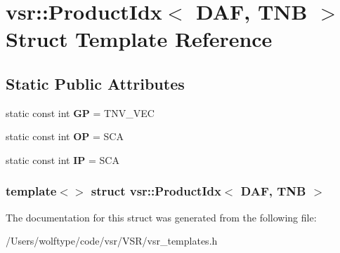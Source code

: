 \hypertarget{structvsr_1_1_product_idx_3_01_d_a_f_00_01_t_n_b_01_4}{\section{vsr\-:\-:Product\-Idx$<$ D\-A\-F, T\-N\-B $>$ Struct Template Reference}
\label{structvsr_1_1_product_idx_3_01_d_a_f_00_01_t_n_b_01_4}
}
\subsection*{Static Public Attributes}
\begin{DoxyCompactItemize}
\item 
\hypertarget{structvsr_1_1_product_idx_3_01_d_a_f_00_01_t_n_b_01_4_a4ee888fdd16e9022fbf97ea9fa7d15f1}{static const int {\bfseries G\-P} = T\-N\-V\-\_\-\-V\-E\-C}\label{structvsr_1_1_product_idx_3_01_d_a_f_00_01_t_n_b_01_4_a4ee888fdd16e9022fbf97ea9fa7d15f1}

\item 
\hypertarget{structvsr_1_1_product_idx_3_01_d_a_f_00_01_t_n_b_01_4_aa8405d655af44e7439a7e11daec2aed8}{static const int {\bfseries O\-P} = S\-C\-A}\label{structvsr_1_1_product_idx_3_01_d_a_f_00_01_t_n_b_01_4_aa8405d655af44e7439a7e11daec2aed8}

\item 
\hypertarget{structvsr_1_1_product_idx_3_01_d_a_f_00_01_t_n_b_01_4_aa9d0ef12f15328bf32088b2a6049e39f}{static const int {\bfseries I\-P} = S\-C\-A}\label{structvsr_1_1_product_idx_3_01_d_a_f_00_01_t_n_b_01_4_aa9d0ef12f15328bf32088b2a6049e39f}

\end{DoxyCompactItemize}
\subsubsection*{template$<$$>$ struct vsr\-::\-Product\-Idx$<$ D\-A\-F, T\-N\-B $>$}



The documentation for this struct was generated from the following file\-:\begin{DoxyCompactItemize}
\item 
/\-Users/wolftype/code/vsr/\-V\-S\-R/vsr\-\_\-templates.\-h\end{DoxyCompactItemize}
